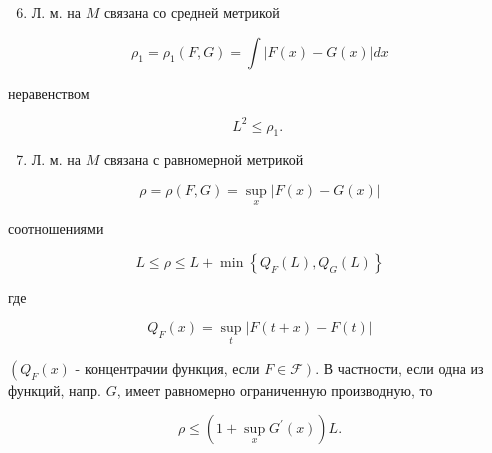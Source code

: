 \documentclass[10pt]{article}
\begin{document}
\begin{enumerate}

  \setcounter{enumi}{5}

  \item Л. м. на $M$ связана со средней метрикой

\end{enumerate}



\[

\rho_{1}=\rho_{1}(F, G)=\int|F(x)-G(x)| d x

\]



неравенством



\[

L^{2} \leqslant \rho_{1} \text {. }

\]



\begin{enumerate}

  \setcounter{enumi}{6}

  \item Л. м. на $M$ связана с равномерной метрикой

\end{enumerate}



\[

\rho=\rho(F, G)=\sup _{x}|F(x)-G(x)|

\]



соотношениями



\[

L \leqslant \rho \leqslant L+\min \left\{Q_{F}(L), Q_{G}(L)\right\}

\]



где



\[

Q_{F}(x)=\sup _{t}|F(t+x)-F(t)|

\]



$\left(Q_{F}(x)\right.$ - концентрачии функция, если $\left.F \in \mathcal{F}\right)$. В частности, если одна из функций, напр. $G$, имеет равномерно ограниченную производную, то



\[

\rho \leqslant\left(1+\sup _{x} G^{\prime}(x)\right) L .

\]
\end{document}
